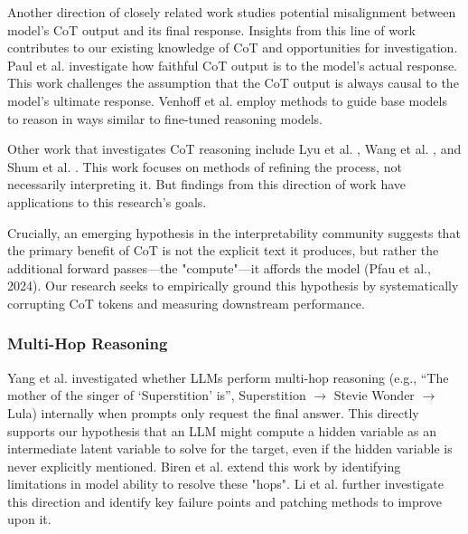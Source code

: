 \documentclass[11pt]{article}
\begin{document}

Another direction of closely related work studies potential misalignment between model's CoT output and its final response. Insights from this line of work contributes to our existing knowledge of CoT and opportunities for investigation. Paul et al. \cite{paul-etal-2024-making} investigate how faithful CoT output is to the model's actual response. This work challenges the assumption that the CoT output is always causal to the model's ultimate response. Venhoff et al. \cite{venhoff2025base} employ methods to guide base models to reason in ways similar to fine-tuned reasoning models. 

Other work that investigates CoT reasoning include Lyu et al. \cite{lyu2023faithful}, Wang et al. \cite{wang2022self}, and Shum et al. \cite{shum2023automatic}. This work focuses on methods of refining the process, not necessarily interpreting it. But findings from this direction of work have applications to this research's goals. 

Crucially, an emerging hypothesis in the interpretability community suggests that the primary benefit of CoT is not the explicit text it produces, but rather the additional forward passes—the "compute"—it affords the model (Pfau et al., 2024). Our research seeks to empirically ground this hypothesis by systematically corrupting CoT tokens and measuring downstream performance.

\subsubsection{Multi-Hop Reasoning}




Yang et al. \cite{yang2024large} investigated whether LLMs perform multi-hop reasoning (e.g., “The mother of the singer of ‘Superstition’ is”, Superstition $\rightarrow$ Stevie Wonder $\rightarrow$ Lula) internally when prompts only request the final answer. This directly supports our hypothesis that an LLM might compute a hidden variable as an intermediate latent variable to solve for the target, even if the hidden variable is never explicitly mentioned. Biren et al. \cite{biran2024hopping} extend this work by identifying limitations in model ability to resolve these "hops". Li et al. \cite{li2024understanding} further investigate this direction and identify key failure points and patching methods to improve upon it. 
\end{document}

